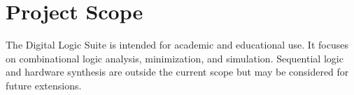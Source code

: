 \section{Project Scope}
The Digital Logic Suite is intended for academic and educational use. It focuses on combinational logic analysis, minimization, and simulation. Sequential logic and hardware synthesis are outside the current scope but may be considered for future extensions.
